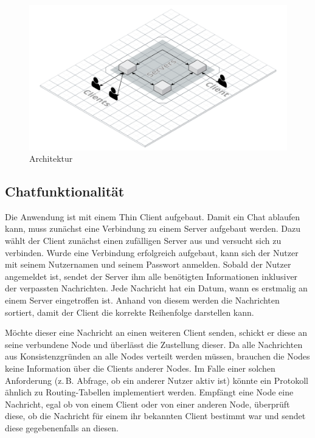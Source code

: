 
\begin{figure}[h]
    \centering
    \includegraphics[width=\textwidth]{architecture.png}
    
    \caption{Architektur}
\end{figure}

\author{Matthias Vonend}
\subsection{Chatfunktionalität}
Die Anwendung ist mit einem Thin Client aufgebaut. Damit ein Chat ablaufen kann, muss zunächst eine Verbindung zu einem Server aufgebaut werden.
Dazu wählt der Client zunächst einen zufälligen Server aus und versucht sich zu verbinden.
Wurde eine Verbindung erfolgreich aufgebaut, kann sich der Nutzer mit seinem Nutzernamen und seinem Passwort anmelden.
Sobald der Nutzer angemeldet ist, sendet der Server ihm alle benötigten Informationen inklusiver der verpassten
Nachrichten. Jede Nachricht hat ein Datum, wann es erstmalig an einem Server eingetroffen ist.
Anhand von diesem werden die Nachrichten sortiert, damit der Client die korrekte Reihenfolge darstellen kann.

Möchte dieser eine Nachricht an einen weiteren Client senden, schickt er diese an seine verbundene Node und
überlässt die Zustellung dieser. Da alle Nachrichten aus Konsistenzgründen an alle Nodes verteilt werden müssen,
brauchen die Nodes keine Information über die Clients anderer Nodes. Im Falle einer solchen Anforderung
(z.\,B. Abfrage, ob ein anderer Nutzer aktiv ist) könnte ein Protokoll ähnlich zu Routing-Tabellen implementiert werden.
Empfängt eine Node eine Nachricht, egal ob von einem Client oder von einer anderen Node,
überprüft diese, ob die Nachricht für einem ihr bekannten Client bestimmt war und sendet diese gegebenenfalls an diesen.

